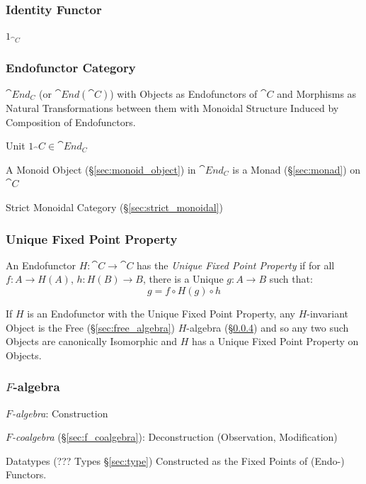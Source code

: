 \subsubsection{Identity Functor}\label{sec:identity_functor}

$1_{\cat{C}}$



\subsubsection{Endofunctor Category}\label{sec:endofunctor_category}

$\cat{End_C}$ (or $\cat{End}(\cat{C})$) with Objects as
Endofunctors of $\cat{C}$ and Morphisms as Natural Transformations
between them with Monoidal Structure Induced by Composition of
Endofunctors.

Unit $1_\cat{C} \in \cat{End_C}$

A Monoid Object (\S\ref{sec:monoid_object}) in $\cat{End_C}$ is a
Monad (\S\ref{sec:monad}) on $\cat{C}$

Strict Monoidal Category (\S\ref{sec:strict_monoidal})



\subsubsection{Unique Fixed Point Property}\label{sec:ufpp}

An Endofunctor $H : \cat{C} \rightarrow \cat{C}$ has the \emph{Unique
  Fixed Point Property} if for all $f : A \rightarrow H(A)$, $h : H(B)
\rightarrow B$, there is a Unique $g : A \rightarrow B$ such that:
\[
  g = f \circ H(g) \circ h
\]

If $H$ is an Endofunctor with the Unique Fixed Point Property, any
$H$-invariant Object is the Free (\S\ref{sec:free_algebra})
$H$-algebra (\S\ref{sec:f_algebra}) and so any two such Objects are
canonically Isomorphic and $H$ has a Unique Fixed Point Property on
Objects.



\subsubsection{$F$-algebra}\label{sec:f_algebra}

\emph{$F$-algebra}: Construction

\emph{$F$-coalgebra} (\S\ref{sec:f_coalgebra}): Deconstruction
(Observation, Modification)

Datatypes (??? Types \S\ref{sec:type}) Constructed as the Fixed Points
of (Endo-) Functors. \cite{jones95} %

